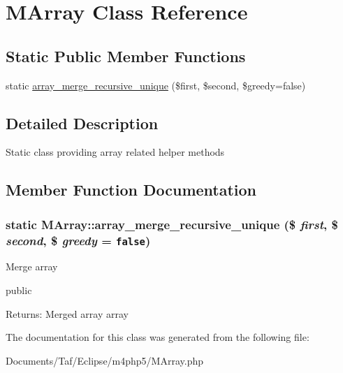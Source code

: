 \hypertarget{classMArray}{
\section{MArray Class Reference}
\label{classMArray}
}
\subsection*{Static Public Member Functions}
\begin{CompactItemize}
\item 
static \hyperlink{classMArray_aa67c30608eea293c932cb35edfdaa4a}{array\_\-merge\_\-recursive\_\-unique} (\$first, \$second, \$greedy=false)
\end{CompactItemize}


\subsection{Detailed Description}
Static class providing array related helper methods 

\subsection{Member Function Documentation}
\hypertarget{classMArray_aa67c30608eea293c932cb35edfdaa4a}{
\subsubsection[array\_\-merge\_\-recursive\_\-unique]{\setlength{\rightskip}{0pt plus 5cm}static MArray::array\_\-merge\_\-recursive\_\-unique (\$ {\em first}, \/  \$ {\em second}, \/  \$ {\em greedy} = {\tt false})}}
\label{classMArray_aa67c30608eea293c932cb35edfdaa4a}


Merge array

public \begin{Desc}
\item[Returns:]Merged array array \end{Desc}


The documentation for this class was generated from the following file:\begin{CompactItemize}
\item 
Documents/Taf/Eclipse/m4php5/MArray.php\end{CompactItemize}
